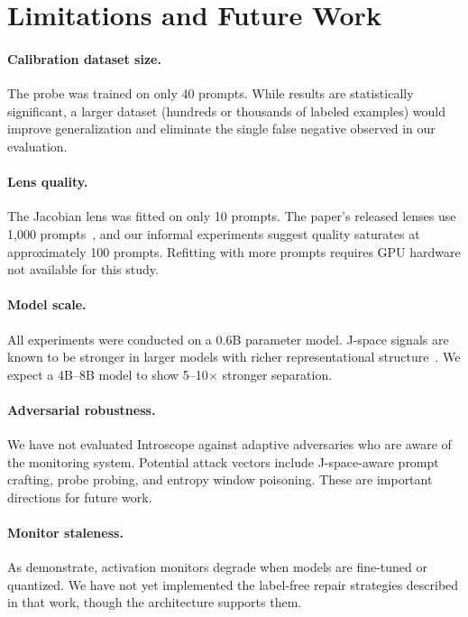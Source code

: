 \documentclass[11pt,twocolumn]{article}
\begin{document}
\section{Limitations and Future Work}

\label{sec:limitations}

\paragraph{Calibration dataset size.} The probe was trained on only 40 prompts. While results are statistically significant, a larger dataset (hundreds or thousands of labeled examples) would improve generalization and eliminate the single false negative observed in our evaluation.

\paragraph{Lens quality.} The Jacobian lens was fitted on only 10 prompts. The paper's released lenses use 1{,}000 prompts~\cite{anthropic2026workspace}, and our informal experiments suggest quality saturates at approximately 100 prompts. Refitting with more prompts requires GPU hardware not available for this study.

\paragraph{Model scale.} All experiments were conducted on a 0.6B parameter model. J-space signals are known to be stronger in larger models with richer representational structure~\cite{anthropic2026workspace}. We expect a 4B--8B model to show 5--10$\times$ stronger separation.

\paragraph{Adversarial robustness.} We have not evaluated Introscope against adaptive adversaries who are aware of the monitoring system. Potential attack vectors include J-space-aware prompt crafting, probe probing, and entropy window poisoning. These are important directions for future work.

\paragraph{Monitor staleness.} As \textcite{staleness2026} demonstrate, activation monitors degrade when models are fine-tuned or quantized. We have not yet implemented the label-free repair strategies described in that work, though the architecture supports them.
\end{document}
